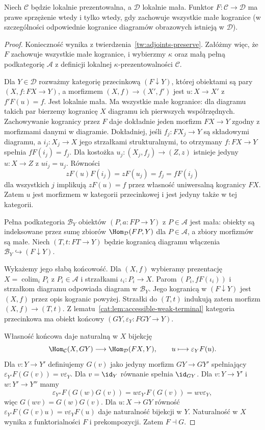 \begin{twierdzenie}\label{cat:thm:accessible-adjoint}
Niech $\mathcal C$ będzie lokalnie prezentowalna, a $\mathcal D$ lokalnie mała. Funktor $F:\mathcal C\to\mathcal D$ ma prawe sprzężenie wtedy i tylko wtedy, gdy zachowuje wszystkie małe kogranice (w szczególności odpowiednie kogranice diagramów obrazowych istnieją w $\mathcal D$).
\end{twierdzenie}
\begin{proof}
Konieczność wynika z twierdzenia~\ref{tw:adjoints-preserve}. Załóżmy więc, że $F$ zachowuje wszystkie małe kogranice, i wybierzmy $\kappa$ oraz małą pełną podkategorię $\mathcal A$ z definicji lokalnej $\kappa$-prezentowalności $\mathcal C$.

Dla $Y\in\mathcal D$ rozważmy kategorię przecinkową $(F\downarrow Y)$, której obiektami są pary $(X,f:FX\to Y)$, a morfizmem $(X,f)\to(X',f')$ jest $u:X\to X'$ z $f'F(u)=f$. Jest lokalnie mała. Ma wszystkie małe kogranice: dla diagramu takich par bierzemy kogranicę $X$ diagramu ich pierwszych współrzędnych. Zachowywanie kogranicy przez $F$ daje dokładnie jeden morfizm $FX\to Y$ zgodny z morfizmami danymi w diagramie. Dokładniej, jeśli $f_j:FX_j\to Y$ są składowymi diagramu, a $i_j:X_j\to X$ jego strzałkami strukturalnymi, to otrzymany $f:FX\to Y$ spełnia $fF(i_j)=f_j$. Dla kostożka $u_j:(X_j,f_j)\to(Z,z)$ istnieje jedyny $u:X\to Z$ z $ui_j=u_j$. Równości
\[
 zF(u)F(i_j)=zF(u_j)=f_j=fF(i_j)
\]
dla wszystkich $j$ implikują $zF(u)=f$ przez własność uniwersalną kogranicy $FX$. Zatem $u$ jest morfizmem w kategorii przecinkowej i jest jedyny także w tej kategorii.

Pełna podkategoria $\mathcal B_Y$ obiektów $(P,a:FP\to Y)$ z $P\in\mathcal A$ jest mała: obiekty są indeksowane przez sumę zbiorów $\Hom_{\mathcal D}(FP,Y)$ dla $P\in\mathcal A$, a zbiory morfizmów są małe. Niech $(T,t:FT\to Y)$ będzie kogranicą diagramu włączenia $\mathcal B_Y\hookrightarrow(F\downarrow Y)$.

Wykażemy jego słabą końcowość. Dla $(X,f)$ wybieramy prezentację $X=\operatorname{colim}_iP_i$ z $P_i\in\mathcal A$ i strzałkami $\iota_i:P_i\to X$. Parom $(P_i,fF(\iota_i))$ i strzałkom diagramu odpowiada diagram w $\mathcal B_Y$. Jego kogranicą w $(F\downarrow Y)$ jest $(X,f)$ przez opis kogranic powyżej. Strzałki do $(T,t)$ indukują zatem morfizm $(X,f)\to(T,t)$. Z lematu~\ref{cat:lem:accessible-weak-terminal} kategoria przecinkowa ma obiekt końcowy $(GY,\varepsilon_Y:FGY\to Y)$.

Własność końcowa daje naturalną w $X$ bijekcję
\[
 \Hom_{\mathcal C}(X,GY)\longrightarrow
 \Hom_{\mathcal D}(FX,Y),\qquad u\longmapsto\varepsilon_YF(u).
\]
Dla $v:Y\to Y'$ definiujemy $G(v)$ jako jedyny morfizm $GY\to GY'$ spełniający $\varepsilon_{Y'}F(G(v))=v\varepsilon_Y$. Dla $v=\id_Y$ równanie spełnia $\id_{GY}$. Dla $v:Y\to Y'$ i $w:Y'\to Y''$ mamy
\[
 \varepsilon_{Y''}F(G(w)G(v))
 =w\varepsilon_{Y'}F(G(v))=wv\varepsilon_Y,
\]
więc $G(wv)=G(w)G(v)$. Dla $u:X\to GY$ równość $\varepsilon_{Y'}F(G(v)u)=v\varepsilon_YF(u)$ daje naturalność bijekcji w $Y$. Naturalność w $X$ wynika z funktorialności $F$ i prekompozycji. Zatem $F\dashv G$.
\end{proof}

